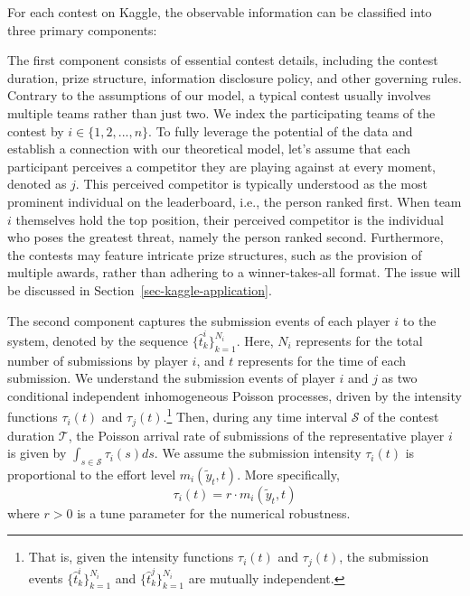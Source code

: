 \documentclass[mnsc]{informs3}
\begin{document}
For each contest on Kaggle, the observable information can be classified into three primary components: 

The first component consists of essential contest details, including the contest duration, prize structure, information disclosure policy, and other governing rules.
Contrary to the assumptions of our model, a typical contest usually involves multiple teams rather than just two.
We index the participating teams of the contest by $i\in\{1, 2, ..., n\}$. 
To fully leverage the potential of the data and establish a connection with our theoretical model, let's assume that each participant perceives a competitor they are playing against at every moment, denoted as $j$. 
This perceived competitor is typically understood as the most prominent individual on the leaderboard, i.e., the person ranked first.
When team $i$ themselves hold the top position, their perceived competitor is the individual who poses the greatest threat, namely the person ranked second.
Furthermore, the contests may feature intricate prize structures, such as the provision of multiple awards, rather than adhering to a winner-takes-all format.
The issue will be discussed in Section~\ref{sec-kaggle-application}. 

The second component captures the submission events of each player $i$ to the system, denoted by the sequence $\{\hat{t}^i_k\}_{k=1}^{N_i}$.
Here, $N_i$ represents for the total number of submissions by player $i$, and $t$ represents for the time of each submission. 
We understand the submission events of player $i$ and $j$ as two conditional independent inhomogeneous Poisson processes, driven by the intensity functions $\tau_i(t)$ and $\tau_j(t)$.\footnote{That is, given the intensity functions $\tau_i(t)$ and $\tau_j(t)$, the submission events $\{\hat{t}^i_k\}_{k=1}^{N_i}$ and $\{\hat{t}^j_k\}_{k=1}^{N_i}$ are mutually independent.}
Then, during any time interval $\mathcal{S}$ of the contest duration $\mathcal{T}$, the Poisson arrival rate of submissions of the representative player $i$ is given by $\int_{s\in\mathcal{S}}\tau_i(s)ds$. 
We assume the submission intensity $\tau_i(t)$ is proportional to the effort level $m_i(\tilde{y}_t, t)$. More specifically, 
\begin{equation}\label{eq-model-intensity}
\tau_i(t) = r \cdot m_i(\tilde{y}_t, t)
\end{equation}
where $r>0$ is a tune parameter for the numerical robustness. 
\end{document}
